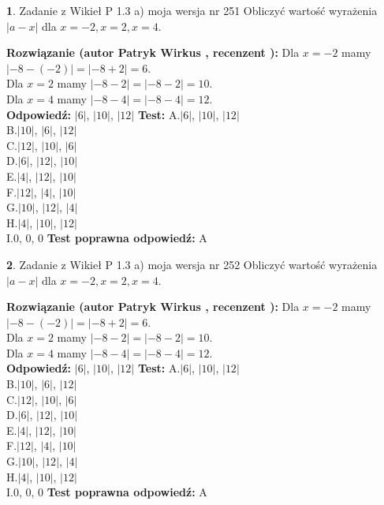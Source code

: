\documentclass[12pt, a4paper]{article}
\theoremstyle{definition} %
\newtheorem{zad}{}
\newcommand{\zadStart}[1]{\begin{zad}#1\newline}
\newcommand{\zadStop}{\end{zad}}
\newcommand{\rozwStart}[2]{\noindent \textbf{Rozwiązanie (autor #1 , recenzent #2): }\newline}
\newcommand{\rozwStop}{\newline}
\newcommand{\odpStart}{\noindent \textbf{Odpowiedź:}\newline}
\newcommand{\odpStop}{\newline}
\newcommand{\testStart}{\noindent \textbf{Test:}\newline}
\newcommand{\testStop}{\newline}
\newcommand{\kluczStart}{\noindent \textbf{Test poprawna odpowiedź:}\newline}
\newcommand{\kluczStop}{\newline}
\begin{document}
\zadStart{Zadanie z Wikieł P 1.3 a) moja wersja nr 251}
Obliczyć wartość wyrażenia $|a - x|$ dla $x=-2,x=2,x=4$.
\zadStop
\rozwStart{Patryk Wirkus}{}
Dla $x = -2$ mamy $|-8 - (-2)| = |-8 + 2| = 6$.\\
Dla $x = 2$ mamy $|-8 - 2| = |-8 - 2| = 10$.\\
Dla $x = 4$ mamy $|-8 - 4| = |-8 - 4| = 12$.\\
\rozwStop
\odpStart
$|6|$, $|10|$, $|12|$
\odpStop
\testStart
A.$|6|$, $|10|$, $|12|$\\
B.$|10|$, $|6|$, $|12|$\\
C.$|12|$, $|10|$, $|6|$\\
D.$|6|$, $|12|$, $|10|$\\
E.$|4|$, $|12|$, $|10|$\\
F.$|12|$, $|4|$, $|10|$\\
G.$|10|$, $|12|$, $|4|$\\
H.$|4|$, $|10|$, $|12|$\\
I.$0$, $0$, $0$
\testStop
\kluczStart
A
\kluczStop



\zadStart{Zadanie z Wikieł P 1.3 a) moja wersja nr 252}
Obliczyć wartość wyrażenia $|a - x|$ dla $x=-2,x=2,x=4$.
\zadStop
\rozwStart{Patryk Wirkus}{}
Dla $x = -2$ mamy $|-8 - (-2)| = |-8 + 2| = 6$.\\
Dla $x = 2$ mamy $|-8 - 2| = |-8 - 2| = 10$.\\
Dla $x = 4$ mamy $|-8 - 4| = |-8 - 4| = 12$.\\
\rozwStop
\odpStart
$|6|$, $|10|$, $|12|$
\odpStop
\testStart
A.$|6|$, $|10|$, $|12|$\\
B.$|10|$, $|6|$, $|12|$\\
C.$|12|$, $|10|$, $|6|$\\
D.$|6|$, $|12|$, $|10|$\\
E.$|4|$, $|12|$, $|10|$\\
F.$|12|$, $|4|$, $|10|$\\
G.$|10|$, $|12|$, $|4|$\\
H.$|4|$, $|10|$, $|12|$\\
I.$0$, $0$, $0$
\testStop
\kluczStart
A
\kluczStop
\end{document}
